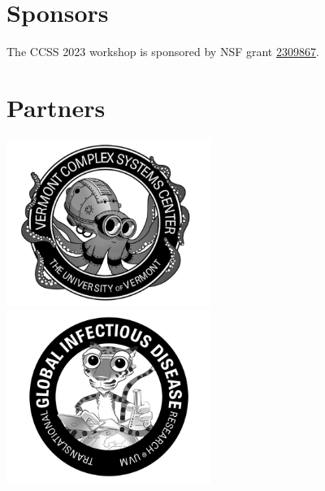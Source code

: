 \section{Sponsors}

\begin{center}
The CCSS 2023 workshop is sponsored by NSF grant \href{https://www.nsf.gov/awardsearch/showAward?AWD_ID=2309867}{2309867}.
\end{center}

\vfill

\section{Partners}

\begin{center}
\includegraphics[width=0.5\textwidth]{images/logos/vcsc.png}
\includegraphics[width=0.5\textwidth]{images/logos/tgir.png}
\end{center}

\vfill